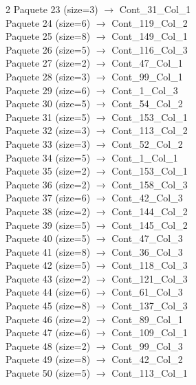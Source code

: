 \begin{multicols}{2}
Paquete 23 (size=3) $\rightarrow$ Cont\_31\_Col\_1\\
Paquete 24 (size=6) $\rightarrow$ Cont\_119\_Col\_2\\
Paquete 25 (size=8) $\rightarrow$ Cont\_149\_Col\_1\\
Paquete 26 (size=5) $\rightarrow$ Cont\_116\_Col\_3\\
Paquete 27 (size=2) $\rightarrow$ Cont\_47\_Col\_1\\
Paquete 28 (size=3) $\rightarrow$ Cont\_99\_Col\_1\\
Paquete 29 (size=6) $\rightarrow$ Cont\_1\_Col\_3\\
Paquete 30 (size=5) $\rightarrow$ Cont\_54\_Col\_2\\
Paquete 31 (size=5) $\rightarrow$ Cont\_153\_Col\_1\\
Paquete 32 (size=3) $\rightarrow$ Cont\_113\_Col\_2\\
Paquete 33 (size=3) $\rightarrow$ Cont\_52\_Col\_2\\
Paquete 34 (size=5) $\rightarrow$ Cont\_1\_Col\_1\\
Paquete 35 (size=2) $\rightarrow$ Cont\_153\_Col\_1\\
Paquete 36 (size=2) $\rightarrow$ Cont\_158\_Col\_3\\
Paquete 37 (size=6) $\rightarrow$ Cont\_42\_Col\_3\\
Paquete 38 (size=2) $\rightarrow$ Cont\_144\_Col\_2\\
Paquete 39 (size=5) $\rightarrow$ Cont\_145\_Col\_2\\
Paquete 40 (size=5) $\rightarrow$ Cont\_47\_Col\_3\\
Paquete 41 (size=8) $\rightarrow$ Cont\_36\_Col\_3\\
Paquete 42 (size=5) $\rightarrow$ Cont\_118\_Col\_3\\
Paquete 43 (size=2) $\rightarrow$ Cont\_121\_Col\_3\\
Paquete 44 (size=6) $\rightarrow$ Cont\_61\_Col\_3\\
Paquete 45 (size=8) $\rightarrow$ Cont\_137\_Col\_3\\
Paquete 46 (size=2) $\rightarrow$ Cont\_89\_Col\_1\\
Paquete 47 (size=6) $\rightarrow$ Cont\_109\_Col\_1\\
Paquete 48 (size=2) $\rightarrow$ Cont\_99\_Col\_3\\
Paquete 49 (size=8) $\rightarrow$ Cont\_42\_Col\_2\\
Paquete 50 (size=5) $\rightarrow$ Cont\_113\_Col\_1\\

\end{multicols}
